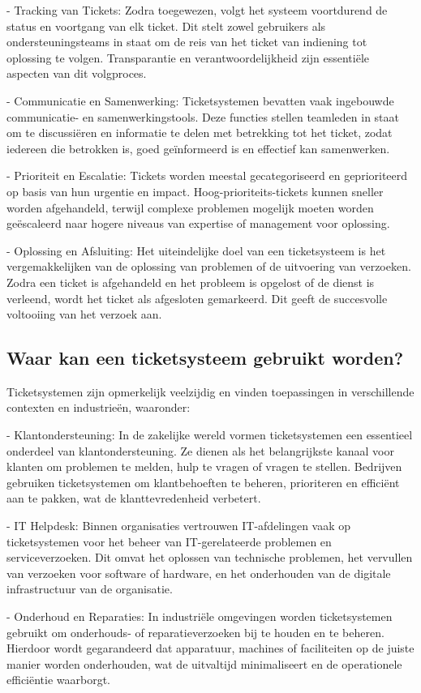 - Tracking van Tickets: Zodra toegewezen, volgt het systeem voortdurend de status en voortgang van elk ticket. Dit stelt zowel gebruikers als ondersteuningsteams in staat om de reis van het ticket van indiening tot oplossing te volgen. Transparantie en verantwoordelijkheid zijn essentiële aspecten van dit volgproces.

- Communicatie en Samenwerking: Ticketsystemen bevatten vaak ingebouwde communicatie- en samenwerkingstools. Deze functies stellen teamleden in staat om te discussiëren en informatie te delen met betrekking tot het ticket, zodat iedereen die betrokken is, goed geïnformeerd is en effectief kan samenwerken.

- Prioriteit en Escalatie: Tickets worden meestal gecategoriseerd en geprioriteerd op basis van hun urgentie en impact. Hoog-prioriteits-tickets kunnen sneller worden afgehandeld, terwijl complexe problemen mogelijk moeten worden geëscaleerd naar hogere niveaus van expertise of management voor oplossing.

- Oplossing en Afsluiting: Het uiteindelijke doel van een ticketsysteem is het vergemakkelijken van de oplossing van problemen of de uitvoering van verzoeken. Zodra een ticket is afgehandeld en het probleem is opgelost of de dienst is verleend, wordt het ticket als afgesloten gemarkeerd. Dit geeft de succesvolle voltooiing van het verzoek aan.

\subsection{Waar kan een ticketsysteem gebruikt worden?}
 Ticketsystemen zijn opmerkelijk veelzijdig en vinden toepassingen in verschillende contexten en industrieën, waaronder:

- Klantondersteuning: In de zakelijke wereld vormen ticketsystemen een essentieel onderdeel van klantondersteuning. Ze dienen als het belangrijkste kanaal voor klanten om problemen te melden, hulp te vragen of vragen te stellen. Bedrijven gebruiken ticketsystemen om klantbehoeften te beheren, prioriteren en efficiënt aan te pakken, wat de klanttevredenheid verbetert.

- IT Helpdesk: Binnen organisaties vertrouwen IT-afdelingen vaak op ticketsystemen voor het beheer van IT-gerelateerde problemen en serviceverzoeken. Dit omvat het oplossen van technische problemen, het vervullen van verzoeken voor software of hardware, en het onderhouden van de digitale infrastructuur van de organisatie.

- Onderhoud en Reparaties: In industriële omgevingen worden ticketsystemen gebruikt om onderhouds- of reparatieverzoeken bij te houden en te beheren. Hierdoor wordt gegarandeerd dat apparatuur, machines of faciliteiten op de juiste manier worden onderhouden, wat de uitvaltijd minimaliseert en de operationele efficiëntie waarborgt.

